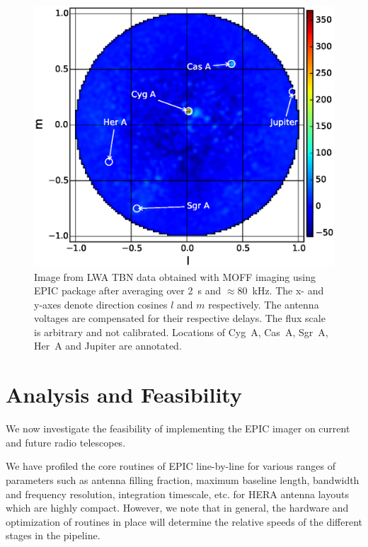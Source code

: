 \documentclass[a4paper,fleqn,usenatbib]{../mnras}
\begin{document}
\begin{figure}
  \includegraphics[width=\columnwidth]{LWA_MOFF_bandavg_image_4_iterations_analytic_aperture.eps}
  \caption{Image from LWA TBN data obtained with MOFF imaging using EPIC 
    package after averaging over 2~s and $\approx 80$~kHz. The x- and y-axes
    denote direction cosines $l$ and $m$ respectively. The antenna voltages
    are compensated for their respective delays. The flux scale is arbitrary
    and not calibrated. Locations of Cyg~A, Cas~A, Sgr~A, Her~A and Jupiter
    are annotated.}
  \label{fig:LWA-image}
\end{figure}

\section{Analysis and Feasibility}\label{sec:analysis}

We now investigate the feasibility of implementing the EPIC imager on current
and future radio telescopes. 

We have profiled the core routines of EPIC line-by-line for various ranges of 
parameters such as antenna filling fraction, maximum baseline length, bandwidth 
and frequency resolution, integration timescale, etc. for HERA antenna layouts 
which are highly compact. However, we note that in general, the hardware and 
optimization of routines in place will determine the relative speeds of the 
different stages in the pipeline. 
\end{document}
